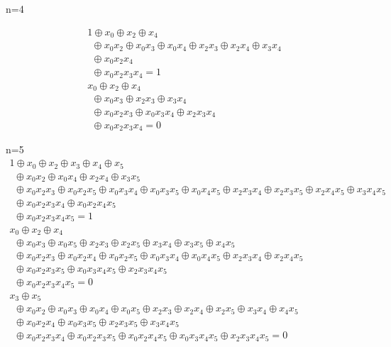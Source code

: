 \documentclass{article}
\begin{document}
\begin{refsection}
{n=4

\[\begin{array}{l}
1  \oplus x_0 
\oplus x_2
\oplus x_4 \\
~~
\oplus x_0x_2 
\oplus x_0x_3 
\oplus x_0x_4
\oplus x_2x_3 
\oplus x_2x_4
\oplus x_3x_4 \\
~~
\oplus x_0x_2x_4 \\
~~
\oplus x_0x_2x_3x_4 
= 1
\\[2ex]
x_0 
\oplus x_2
\oplus x_4  \\
~~
\oplus x_0x_3
\oplus x_2x_3
\oplus x_3x_4 \\
~~
\oplus x_0x_2x_3 
\oplus x_0x_3x_4 
\oplus x_2x_3x_4 \\
~~
\oplus x_0x_2x_3x_4 
= 0
\end{array}\]

n=5
\[\begin{array}{l}
1 \oplus x_0
\oplus x_2
\oplus x_3
\oplus x_4
\oplus x_5 \\
~~
\oplus x_0x_2
\oplus x_0x_4
\oplus x_2x_4
\oplus x_3x_5 \\
~~
\oplus x_0x_2x_3
\oplus x_0x_2x_5
\oplus x_0x_3x_4
\oplus x_0x_3x_5
\oplus x_0x_4x_5
\oplus x_2x_3x_4
\oplus x_2x_3x_5
\oplus x_2x_4x_5
\oplus x_3x_4x_5 \\
~~
\oplus x_0x_2x_3x_4
\oplus x_0x_2x_4x_5 \\
~~
\oplus x_0x_2x_3x_4x_5
= 1
\\[2ex]

x_0 
\oplus x_2
\oplus x_4 \\
~~
\oplus x_0x_3
\oplus x_0x_5
\oplus x_2x_3 
\oplus x_2x_5 
\oplus x_3x_4 
\oplus x_3x_5 
\oplus x_4x_5 \\
~~
\oplus x_0x_2x_3 
\oplus x_0x_2x_4 
\oplus x_0x_2x_5 
\oplus x_0x_3x_4 
\oplus x_0x_4x_5 
\oplus x_2x_3x_4 
\oplus x_2x_4x_5 \\
~~
\oplus x_0x_2x_3x_5
\oplus x_0x_3x_4x_5 
\oplus x_2x_3x_4x_5 \\
~~
\oplus x_0x_2x_3x_4x_5 
= 0
\\[2ex]

x_3
\oplus x_5 \\
~~
\oplus x_0x_2 
\oplus x_0x_3 
\oplus x_0x_4 
\oplus x_0x_5 
\oplus x_2x_3 
\oplus x_2x_4
\oplus x_2x_5
\oplus x_3x_4
\oplus x_4x_5 \\
~~
\oplus x_0x_2x_4 
\oplus x_0x_3x_5
\oplus x_2x_3x_5 
\oplus x_3x_4x_5 \\
~~
\oplus x_0x_2x_3x_4 
\oplus x_0x_2x_3x_5
\oplus x_0x_2x_4x_5 
\oplus x_0x_3x_4x_5 
\oplus x_2x_3x_4x_5
= 0
\end{array}\]

}
\end{refsection}
\end{document}
